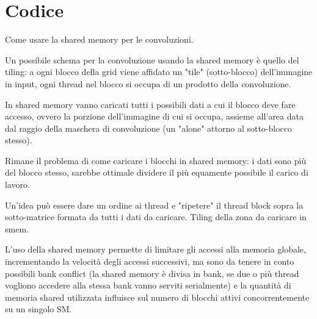 \section{Codice}

\begin{questions}
    \question Come usare la shared memory per le convoluzioni.
    
    \begin{solution}
        Un possibile schema per la convoluzione usando la shared memory è quello del tiling: a ogni blocco della grid viene affidato un "tile" (sotto-blocco) dell'immagine in input, ogni thread nel blocco si occupa di un prodotto della convoluzione. 
        
        In shared memory vanno caricati tutti i possibili dati a cui il blocco deve fare accesso, ovvero la porzione dell'immagine di cui si occupa, assieme all'area data dal raggio della maschera di convoluzione (un "alone" attorno al sotto-blocco stesso).
        
        Rimane il problema di come caricare i blocchi in shared memory: i dati sono più del blocco stesso, sarebbe ottimale dividere il più equamente possibile il carico di lavoro. 
        
        Un'idea può essere dare un ordine ai thread e "ripetere" il thread block sopra la sotto-matrice formata da tutti i dati da caricare. Tiling della zona da caricare in smem.
        
        L'uso della shared memory permette di limitare gli accessi alla memoria globale, incrementando la velocità degli accessi successivi, ma sono da tenere in conto possibili bank conflict (la shared memory è divisa in bank, se due o più thread vogliono accedere alla stessa bank vanno serviti serialmente) e la quantità di memoria shared utilizzata influisce sul numero di blocchi attivi concorrentemente su un singolo SM.
        

\end{solution}
\end{questions}
